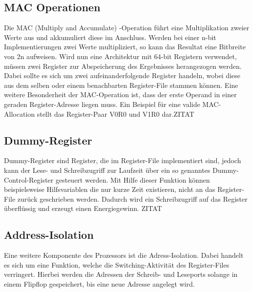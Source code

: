 \subsection{MAC Operationen}\label{subsec:macMode}
Die MAC (Multiply and Accumulate) -Operation führt eine Multiplikation zweier Werte aus und akkumuliert diese im Anschluss. Werden bei einer n-bit Implementierungen zwei Werte multipliziert, so kann das Resultat eine Bitbreite von 2n aufweisen. Wird nun eine Architektur mit 64-bit Registern verwendet, müssen zwei Register zur Abspeicherung des Ergebnisses herangezogen werden. Dabei sollte es sich um zwei aufeinanderfolgende Register handeln, wobei diese aus dem selben oder einem benachbarten Register-File stammen können. Eine weitere Besonderheit der MAC-Operation ist, dass der erste Operand in einer geraden Register-Adresse liegen muss. Ein Beispiel für eine valide MAC-Allocation stellt das  Register-Paar V0R0 und V1R0 dar.ZITAT
  

\subsection{Dummy-Register}\label{subsec:dummy}
Dummy-Register sind Register, die im Register-File implementiert sind, jedoch kann der Lese- und Schreibzugriff zur Laufzeit über ein so genanntes Dummy-Control-Register gesteuert werden. Mit Hilfe dieser Funktion können beispielsweise Hilfsvariablen die nur kurze Zeit existieren, nicht an das Register-File zurück geschrieben werden. Dadurch wird ein Schreibzugriff auf das Register überflüssig und erzeugt einen Energiegewinn. ZITAT

\subsection{Address-Isolation}\label{subsec:add_iso}
Eine weitere Komponente des Prozessors ist die Adress-Isolation. Dabei handelt es sich um eine Funktion, welche die Switching-Aktivität des Register-Files verringert. Hierbei werden die Adressen der Schreib- und Leseports solange in einem Flipflop gespeichert, bis eine neue Adresse angelegt wird.\cite{lukasglitches2017}



